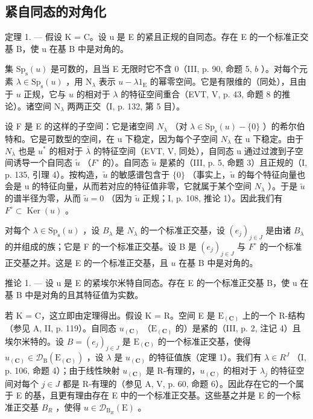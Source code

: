 \subsection{紧自同态的对角化}

定理 1. --- 假设 K = C。设 u 是 E 的紧且正规的自同态。存在 E 的一个标准正交基 B，使 u 在基 B 中是对角的。

集 \(\mathrm{Sp}_{\mathrm{s}}(u)\) 是可数的，且当 E 无限时它不含 0（III, p. 90, 命题 5, \(b\) ）。对每个元素 \(\lambda \in \mathrm{Sp}_{\mathrm{s}}(u)\) ，用 \(\mathrm{N}_{\lambda}\) 表示 \(u - \lambda 1_{\mathrm{E}}\) 的幂零空间。它是有限维的（同处），且由于 \(u\) 正规，它与 \(u\) 的相对于 \(\lambda\) 的特征空间重合（EVT, V, p. 43, 命题 8 的推论）。诸空间 \(\mathrm{N}_{\lambda}\) 两两正交（I, p. 132, 第 5 目）。

设 F 是 E 的这样的子空间：它是诸空间 \(N_{\lambda}\) （对 \(\lambda \in \mathrm{Sp}_{\mathrm{s}}(u) - \{0\}\) ）的希尔伯特和。它是可数型的空间，在 u 下稳定，因为每个子空间 \(N_{\lambda}\) 在 u 下稳定。由于 \(N_{\lambda}\) 也是 \(u^{*}\) 的相对于 \(\overline{\lambda}\) 的特征空间（EVT, V, 同处），自同态 u 通过过渡到子空间诱导一个自同态 \(\widetilde{u}\) （\(F^{\circ}\) 的）。自同态 \(\widetilde{u}\) 是紧的（III, p. 5, 命题 3）且正规的（I, p. 135, 引理 4）。按构造，\(\widetilde{u}\) 的敏感谱包含于 \(\{0\}\) （事实上，\(\widetilde{u}\) 的每个特征向量也会是 u 的特征向量，从而若对应的特征值非零，它就属于某个空间 \(N_{\lambda}\) ）。于是 \(\widetilde{u}\) 的谱半径为零，从而 \(\widetilde{u}=0\) （因为 \(\widetilde{u}\) 正规；I, p. 108, 推论 1）。因此我们有 \(F^{\circ}\subset\operatorname{Ker}(u)\) 。

对每个 \(\lambda \in \mathrm{Sp}_{\mathrm{s}}(u)\) ，设 \(B_{\lambda}\) 是 \(N_{\lambda}\) 的一个标准正交基，设 \((e_j)_{j \in J}\) 是由诸 \(B_{\lambda}\) 的并组成的族；它是 F 的一个标准正交基。设 B 是 \((e_j)_{j \in J}\) 与 \(F^{\circ}\) 的一个标准正交基之并。这是 E 的一个标准正交基，且 \(u\) 在基 B 中是对角的。

推论 1. --- 设 u 是 E 的紧埃尔米特自同态。存在 E 的一个标准正交基 B，使 u 在基 B 中是对角的且其特征值为实数。

若 K = C，这立即由定理得出。假设 K = R。空间 E 是 \(\mathrm{E}_{(\mathbf{C})}\) 上的一个 R-结构（参见 A, II, p. 119）。自同态 \(u_{(\mathbf{C})}\) （\(\mathrm{E}_{(\mathbf{C})}\) 的）是紧的（III, p. 2, 注记 4）且埃尔米特的。设 \(B = (e_j)_{j \in J}\) 是 \(\mathrm{E}_{(\mathbf{C})}\) 的一个标准正交基，使得 \(u_{(\mathbf{C})} \in \mathcal{D}_{\mathrm{B}}(\mathrm{E}_{(\mathbf{C})})\) ，设 \(\lambda\) 是 \(u_{(\mathbf{C})}\) 的特征值族（定理 1）。我们有 \(\lambda \in R^{J}\) （I, p. 106, 命题 4）；由于线性映射 \(u_{(\mathbf{C})}\) 是 R-有理的，\(u_{(\mathbf{C})}\) 的相对于 \(\lambda_j\) 的特征空间对每个 \(j \in J\) 都是 R-有理的（参见 A, V, p. 60, 命题 6）。因此存在它的一个属于 E 的基，且更有理由存在 E 中的一个标准正交基。这些基之并是 E 的一个标准正交基 \(B_R\) ，使得 \(u \in \mathcal{D}_{\mathrm{B}_R}(\mathrm{E})\) 。

